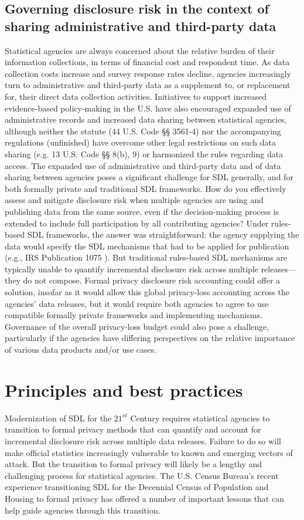 \subsection{Governing disclosure risk in the context of sharing administrative and third-party data}
Statistical agencies are always concerned about the relative burden of their information collections, in terms of financial cost and respondent time. As data collection costs increase and survey response rates decline, agencies increasingly turn to administrative and third-party data as a supplement to, or replacement for, their direct data collection activities. Initiatives to support increased evidence-based policy-making in the U.S. have also encouraged expanded use of administrative records and increased data sharing between statistical agencies, although neither the statute (44 U.S. Code §§ 3561-4) nor the accompanying regulations (unfinished) have overcome other legal restrictions on such data sharing (e.g. 13 U.S. Code §§ 8(b), 9) or harmonized the rules regarding data access. The expanded use of administrative and third-party data and of data sharing between agencies poses a significant challenge for SDL generally, and for both formally private and traditional SDL frameworks.  How do you effectively assess and mitigate disclosure risk when multiple agencies are using and publishing data from the same source, even if the decision-making process is extended to include full participation by all contributing agencies? Under rules-based SDL frameworks, the answer was straightforward: the agency supplying the data would specify the SDL mechanisms that had to be applied for publication (e.g., IRS Publication 1075 \cite{IRS:1075}). But traditional rules-based SDL mechanisms are typically unable to quantify incremental disclosure risk across multiple releases---they do not compose. Formal privacy disclosure risk accounting could offer a solution, insofar as it would allow this global privacy-loss accounting across the agencies' data releases, but it would require both agencies to agree to use compatible formally private frameworks and implementing mechanisms. Governance of the overall privacy-loss budget could also pose a challenge, particularly if the agencies have differing perspectives on the relative importance of various data products and/or use cases.

\section{Principles and best practices }
Modernization of SDL for the $21^{st}$ Century requires statistical agencies to transition to formal privacy methods that can quantify and account for incremental disclosure risk across multiple data releases. Failure to do so will make official statistics increasingly vulnerable to known and emerging vectors of attack. But the transition to formal privacy will likely be a lengthy and challenging process for statistical agencies. The U.S. Census Bureau's recent experience transitioning SDL for the Decennial Census of Population and Housing to formal privacy has offered a number of important lessons that can help guide agencies through this transition.

